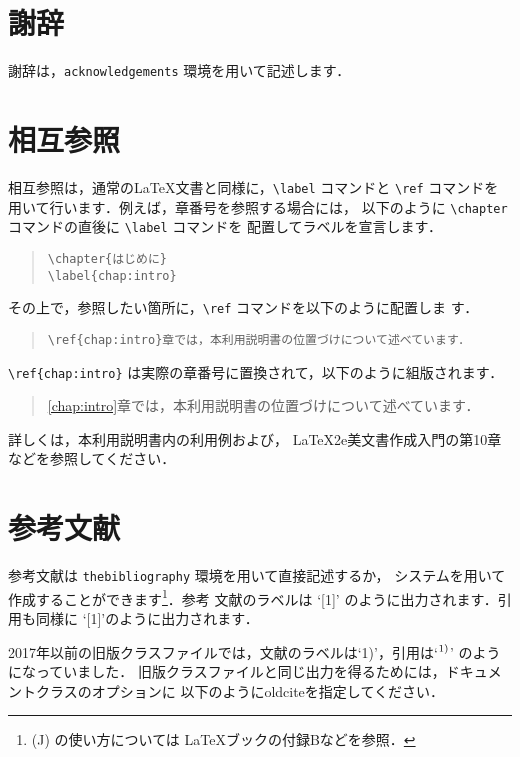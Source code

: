 \documentclass[sotsuron]{kuee}
\begin{document}
\section{謝辞}
謝辞は，\verb+acknowledgements+ 環境を用いて記述します．

\section{相互参照}
\label{cross_reference}
相互参照は，通常の\LaTeX{}文書と同様に，\verb+\label+ コマンドと
\verb+\ref+ コマンドを用いて行います．例えば，章番号を参照する場合には，
以下のように \verb+\chapter+ コマンドの直後に \verb+\label+ コマンドを
配置してラベルを宣言します．
\begin{quote}
  \begin{verbatim}
\chapter{はじめに}
\label{chap:intro}
\end{verbatim}
\end{quote}
その上で，参照したい箇所に，\verb+\ref+ コマンドを以下のように配置しま
す．
\begin{quote}
  \begin{verbatim}
\ref{chap:intro}章では，本利用説明書の位置づけについて述べています．
\end{verbatim}
\end{quote}
\verb+\ref{chap:intro}+ は実際の章番号に置換されて，以下のように組版されます．
\begin{quote}
  \ref{chap:intro}章では，本利用説明書の位置づけについて述べています．
\end{quote}
詳しくは，本利用説明書内の利用例および，
\LaTeX2e{}美文書作成入門\cite{GuideBook}の第10章などを参照してください．


\section{参考文献}
参考文献は \verb+thebibliography+ 環境を用いて直接記述するか，
\JBibTeX{} システムを用いて作成することができます\footnote{(J)\BibTeX
  の使い方については \LaTeX ブック\cite{LaTeX}の付録Bなどを参照．}．参考
文献のラベルは `[1]' のように出力されます．引用も同様に
`[1]'のように出力されます．

2017年以前の旧版クラスファイルでは，文献のラベルは`1)'，引用は`$^{\mbox{\scriptsize 1)}}$'
のようになっていました．
旧版クラスファイルと同じ出力を得るためには，ドキュメントクラスのオプションに
以下のように{\ttfamily oldcite}を指定してください．
\end{document}

